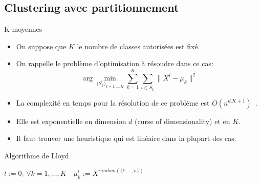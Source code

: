 \documentclass[8pt]{beamer}
\begin{document}
		\subsection{Clustering avec partitionnement}
			\begin{frame}{K-moyennes}
				\begin{itemize}
					\item<1-> On suppose que \(K\) le nombre de classes autorisées est fixé.
					\item<2-> On rappelle le problème d'optimisation à résoudre dans ce cas:
						\begin{equation}
							\arg \min_{\big(S_k\big)_{k = 1, \dots, K}} \sum_{k= 1}^{K} \sum_{i\in S_k} \lVert X^i - \mu_k\rVert^2
						\end{equation}
					\item<3-> La complexité en temps pour la résolution de ce problème est \(O(n^{d.K+1})\)~\cite{inaba1994applications}.
					\item<4-> Elle est exponentielle en dimension \(d\) (curse of dimensionality) et en \(K\).
					\item<5-> Il faut trouver une heuristique qui est linéaire dans la plupart des cas.
				\end{itemize}
			\end{frame}
			\begin{frame}{Algorithme de Lloyd}
				\begin{algorithm}[H]

					\(t := 0\), \(\forall k = 1,\dots,K \quad \mu^t_k := X^{random(\{1,\dots,n\})}\)\;
				\end{algorithm}
			\end{frame}
\end{document}
